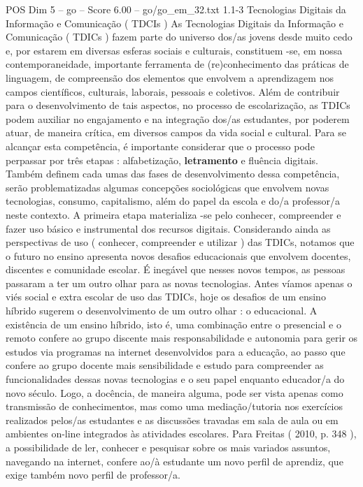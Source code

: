 \begin{textsample}{POS Dim 5 – go – Score 6.00 – go/go\_em\_32.txt}  \label{ex:f5_pos_011}
1.1-3 Tecnologias Digitais da Informação e Comunicação ( TDCIs ) As Tecnologias Digitais da Informação e Comunicação ( TDICs ) fazem parte do universo dos/as jovens desde muito cedo e, por estarem em diversas esferas sociais e culturais, constituem -se, em nossa contemporaneidade, importante ferramenta de (re)conhecimento das práticas de linguagem, de compreensão dos elementos que envolvem a aprendizagem nos campos científicos, culturais, laborais, pessoais e coletivos.
Além de contribuir para o desenvolvimento de tais aspectos, no processo de escolarização, as TDICs podem auxiliar no engajamento e na integração dos/as estudantes, por poderem atuar, de maneira crítica, em diversos campos da vida social e cultural.
Para se alcançar esta competência, é importante considerar que o processo pode perpassar por três etapas : alfabetização, \textbf{letramento} e fluência digitais.
Também definem cada umas das fases de desenvolvimento dessa competência, serão problematizadas algumas concepções sociológicas que envolvem novas tecnologias, consumo, capitalismo, além do papel da escola e do/a professor/a neste contexto.
A primeira etapa materializa -se pelo conhecer, compreender e fazer uso básico e instrumental dos recursos digitais.
Considerando ainda as perspectivas de uso ( conhecer, compreender e utilizar ) das TDICs, notamos que o futuro no ensino apresenta novos desafios educacionais que envolvem docentes, discentes e comunidade escolar.
É inegável que nesses novos tempos, as pessoas passaram a ter um outro olhar para as novas tecnologias.
Antes víamos apenas o viés social e extra escolar de uso das TDICs, hoje os desafios de um ensino híbrido sugerem o desenvolvimento de um outro olhar : o educacional.
A existência de um ensino híbrido, isto é, uma combinação entre o presencial e o remoto confere ao grupo discente mais responsabilidade e autonomia para gerir os estudos via programas na internet desenvolvidos para a educação, ao passo que confere ao grupo docente mais sensibilidade e estudo para compreender as funcionalidades dessas novas tecnologias e o seu papel enquanto educador/a do novo século.
Logo, a docência, de maneira alguma, pode ser vista apenas como transmissão de conhecimentos, mas como uma mediação/tutoria nos exercícios realizados pelos/as estudantes e as discussões travadas em sala de aula ou em ambientes on-line integrados às atividades escolares.
Para Freitas ( 2010, p. 348 ), a possibilidade de ler, conhecer e pesquisar sobre os mais variados assuntos, navegando na internet, confere ao/à estudante um novo perfil de aprendiz, que exige também novo perfil de professor/a.

\end{textsample}
